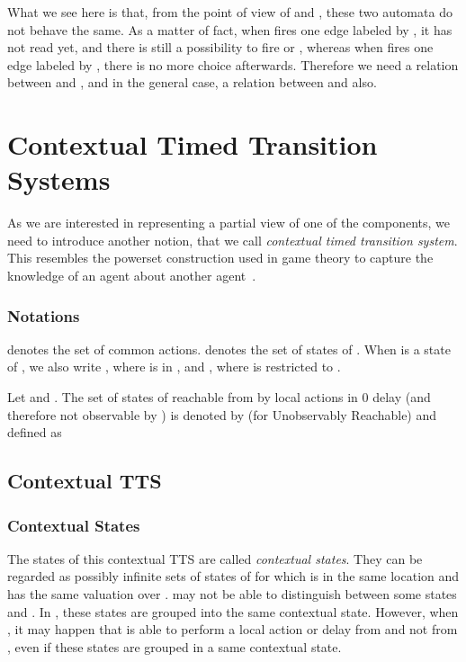 \documentclass{LMCS}
\theoremstyle{plain}\newtheorem*{prop11}{Proposition~\ref{prop:states} bis}
\begin{document}
What we see here is that, from the point of view of  and ,
these two automata do not behave the same. As a matter of fact, when  
fires one edge labeled by , it has not read  yet, and there is still a
possibility to fire  or , whereas when  fires one edge labeled
by , there is no more choice afterwards. Therefore we need a relation
between  and , and in the general case,
a relation between  and  also.



\section{Contextual Timed Transition Systems}\label{sec:TTS}

As we are interested in representing a partial view of one of the components, we
need to introduce another notion, that we call \emph{contextual timed transition
system}. This resembles the powerset construction used in game theory to
capture the knowledge of an agent about another agent~\cite{Reif}.

\subsubsection*{Notations}
 denotes the set of common actions.
 denotes the set of states of .
When  is a state of , we also write
\mbox{}, where  is in , and
, where  is  restricted to
.


\begin{defi}[]
Let \mbox{} and .
The set of states of  reachable from  by local actions in 0 delay
(and therefore not observ\-able by ) is denoted by  (for
Unobservably Reachable) and defined as

\end{defi}

\subsection{Contextual TTS}

\subsubsection*{Contextual States}
The states of this contextual TTS are called \emph{contextual states}. They can
be regarded as possibly infinite sets of states of   for which
 is in the same location and has the same valuation over .
 may not be able to distinguish between some states
 and . In , these states are
grouped into the same contextual state.
However, when , it may happen that  is able
to perform a local action or delay from  and not from
, even if these states are grouped in a same contextual state.
\end{document}
